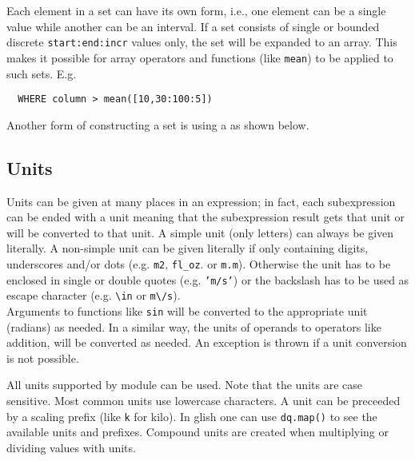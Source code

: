 Each element in a set can have its own form, i.e., one element can
be a single value while another can be an interval.
If a set consists of single or bounded discrete
\texttt{start:end:incr} values only, the set will be expanded to an
array.
This makes it possible for array operators and functions
(like \texttt{mean}) to be applied to such sets. E.g.
\begin{verbatim}
  WHERE column > mean([10,30:100:5])
\end{verbatim}

Another form of constructing a set is using a
 as shown below.

\subsection{\label{TAQL:UNITS}Units}
Units can be given at many places in an expression; in fact, each
subexpression can be ended with a unit meaning that the subexpression
result gets that unit or will be converted to that unit. A simple
unit (only letters) can always be given literally. A non-simple unit
can be given literally if only containing digits, underscores and/or
dots (e.g. \texttt{m2}, \texttt{fl\_oz}. or \texttt{m.m}).
Otherwise the unit has to be enclosed in single or double quotes
(e.g. \texttt{'m/s'}) or the backslash has to be used as escape
character (e.g. \verb+\+\texttt{in} or \texttt{m}\verb+\+\texttt{/s}).
\\Arguments to functions like \texttt{sin} will be converted to the
appropriate unit (radians) as needed. In a similar way, the units of
operands to operators like addition, will be converted as needed.
An exception is thrown if a unit conversion is not possible.

All units supported by module
can be used. Note that the
units are case sensitive. Most common units use lowercase characters.
A unit can be preceeded by a scaling prefix (like \texttt{k} for kilo).
In glish one can use \texttt{dq.map()} to see the available units and
prefixes. Compound units are created when multiplying or
dividing values with units.

